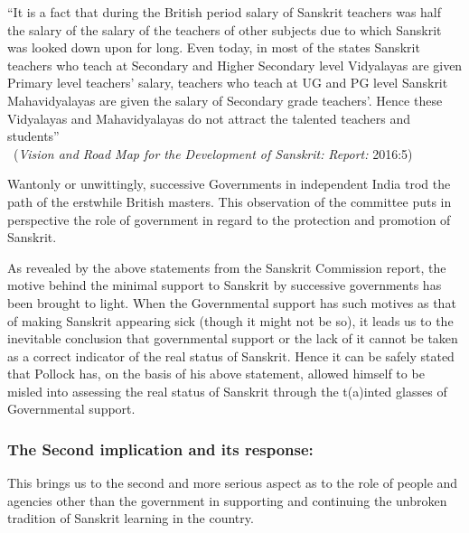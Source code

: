 \begin{myquote}
\eleven
“It is a fact that during the British period salary of Sanskrit teachers was half the salary of the salary of the teachers of other subjects due to which Sanskrit was looked down upon for long. Even today, in most of the states Sanskrit teachers who teach at Secondary and Higher Secondary level Vidyalayas are given Primary level teachers’ salary, teachers who teach at UG and PG level Sanskrit Mahavidyalayas are given the salary of Secondary grade teachers’. Hence these Vidyalayas and Mahavidyalayas do not attract the talented teachers and students”\\[-15pt]  

~\hfill({\sl Vision and Road Map for the Development of Sanskrit:} {\sl Report:} 2016:5) 
\end{myquote}

Wantonly or unwittingly, successive Governments in independent India trod the path of the erstwhile British masters. This observation of the committee puts in perspective the role of government in regard to the protection and promotion of Sanskrit. 

As revealed by the above statements from the Sanskrit Commission report, the motive behind the minimal support to Sanskrit by successive governments has been brought to light. When the Governmental support has such motives as that of making Sanskrit appearing sick (though it might not be so), it leads us to the inevitable conclusion that  governmental support or the lack of it cannot be taken as a correct indicator of the real status of Sanskrit. Hence it can be safely stated that Pollock has, on the basis of his above statement, allowed himself to be misled into assessing the real status of Sanskrit through the t(a)inted glasses of Governmental support.

\subsubsection{The Second implication and its response:}

This brings us to the second and more serious aspect as to the role of people and agencies other than the government in supporting and continuing the unbroken tradition of Sanskrit learning in the country.

